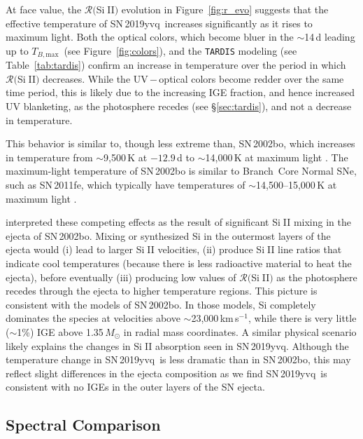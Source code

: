 \documentclass[twocolumn]{aastex63}
\def\ion#1#2{#1$\;${\footnotesize\rm{#2}}\relax}
\newcommand{\tbmax}{$T_{B,\mathrm{max}}$}
\newcommand{\kms}{km\,s$^{-1}$}
\newcommand{\sn}{SN\,2019yvq}
\begin{document}
At face value, the $\mathcal{R}($\ion{Si}{II}$)$ evolution in
Figure~\ref{fig:r_evo} suggests that the effective temperature of \sn\
increases significantly as it rises to maximum light. Both the optical colors,
which become bluer in the $\sim$14\,d leading up to \tbmax\ (see
Figure~\ref{fig:colors}), and the \texttt{TARDIS} modeling (see
Table~\ref{tab:tardis}) confirm an increase in temperature over the period in
which $\mathcal{R}($\ion{Si}{II}$)$ decreases. While the UV\,$-$\,optical
colors become redder over the same time period, this is likely due to the
increasing IGE fraction, and hence increased UV blanketing, as the photosphere
recedes (see \S\ref{sec:tardis}), and not a decrease in temperature.

This behavior is similar to, though less extreme than, SN\,2002bo, which
increases in temperature from $\sim$9,500\,K at $-12.9$\,d to $\sim$14,000\,K
at maximum light \citep{Stehle05}. The maximum-light temperature of SN\,2002bo
is similar to Branch~Core Normal SNe, such as SN\,2011fe, which
typically have temperatures of $\sim$14,500--15,000\,K at maximum light
\citep{Mazzali14}.

\citet{Benetti04} interpreted these competing effects as the result of
significant \ion{Si}{II} mixing in the ejecta of SN\,2002bo. Mixing or
synthesized Si in the outermost layers of the ejecta would (i) lead to larger
\ion{Si}{II} velocities, (ii) produce \ion{Si}{II} line ratios that indicate
cool temperatures (because there is less radioactive material to heat the
ejecta), before eventually (iii) producing low values of
$\mathcal{R}($\ion{Si}{II}$)$ as the photosphere recedes through the ejecta to
higher temperature regions. This picture is consistent with the
\citet{Stehle05} models of SN\,2002bo. In those models, Si completely
dominates the species at velocities above $\sim$23,000\,\kms, while there is
very little ($\sim$1\%) IGE above 1.35\,$M_\odot$ in radial mass
coordinates. A similar physical scenario likely explains the changes in
\ion{Si}{II} absorption seen in \sn. Although the temperature change in \sn\
is less dramatic than in SN\,2002bo, this may reflect slight differences in
the ejecta composition as we find \sn\ is consistent with no IGEs in the outer
layers of the SN ejecta.

\subsection{Spectral Comparison}\label{sec:spec_comp}
\end{document}
